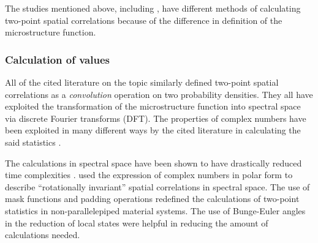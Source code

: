 The studies mentioned above, including , have different methods of calculating two-point spatial correlations because of the difference in definition of the microstructure function.

\subsubsection{Calculation of values}

All of the cited literature on the topic similarly defined two-point spatial correlations as a \emph{convolution} operation on two probability densities.
They all have exploited the transformation of the microstructure function into spectral space via discrete Fourier transforms (DFT).
The properties of complex numbers have been exploited in many different ways by the cited literature in calculating the said statistics \cite{delin,polar,sun17,bunge,yabansu14}.

The calculations in spectral space have been shown to have drastically reduced time complexities \cite{delin}.
 used the expression of complex numbers in polar form to describe ``rotationally invariant'' spatial correlations in spectral space.
The use of mask functions and padding operations \cite{sun17} redefined the calculations of two-point statistics in non-parallelepiped material systems.
The use of Bunge-Euler angles in the reduction of local states \cite{bunge, yabansu14} were helpful in reducing the amount of calculations needed.
